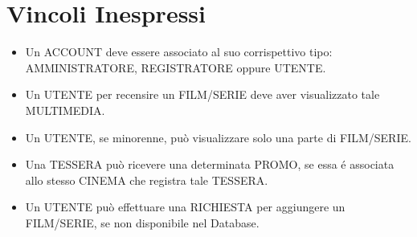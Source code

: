 \documentclass[a4paper,12pt]{report}
\begin{document}
\section{Vincoli Inespressi}
\begin{itemize}
	\item Un ACCOUNT deve essere associato al suo corrispettivo tipo: AMMINISTRATORE, REGISTRATORE oppure UTENTE.
	\item Un UTENTE per recensire un FILM/SERIE deve aver visualizzato tale MULTIMEDIA.
	\item Un UTENTE, se minorenne, può visualizzare solo una parte di FILM/SERIE.
	\item Una TESSERA può ricevere una determinata PROMO, se essa é associata allo stesso CINEMA che registra tale TESSERA.
	\item Un UTENTE può effettuare una RICHIESTA per aggiungere un FILM/SERIE, se non disponibile nel Database.
\end{itemize}
\end{document}
